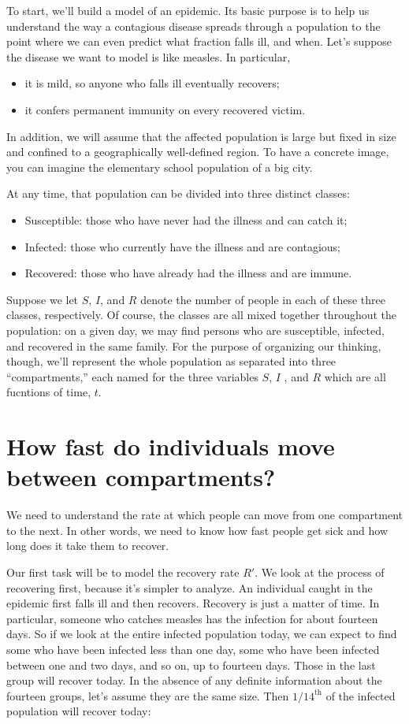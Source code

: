 \documentclass
[justified,nohyper]
{tufte-handout}
\begin{document}
To start, we'll build a model of an epidemic. Its basic purpose is to help us 
understand the way a contagious disease spreads through a population to the point 
where we can even predict what fraction falls ill, and when. Let's suppose the 
disease we want to model is like measles. In particular,
\begin{itemize}
	\item it is mild, so anyone who falls ill eventually recovers;
	\item it confers permanent immunity on every recovered victim.
\end{itemize}

In addition, we will assume that the affected population is large but fixed in 
size and confined to a geographically well-defined region. To have a concrete 
image, you can imagine the elementary school population of a big city.

At any time, that population can be divided into three distinct classes:
\begin{itemize}
	\item Susceptible: those who have never had the illness and can catch it;
	\item Infected: those who currently have the illness and are contagious;
	\item Recovered: those who have already had the illness and are immune.
\end{itemize}

Suppose we let $S$, $I$, and $R$ denote the number of people in each of these 
three classes, respectively. Of course, the classes are all mixed together 
throughout the population: on a given day, we may find persons who are 
susceptible, infected, and recovered in the same family. For the purpose of 
organizing our thinking, though, we'll represent the whole population as 
separated into three ``compartments,'' each named for the three variables $S$, $I$
, and $R$ which are all fucntions of time, $t$.

\section{How fast do individuals move between compartments?} 
We need to understand the rate at which people can move from one compartment to 
the next. In other words, we need to know how fast people get sick and how long 
does it take them to recover.

Our first task will be to model the recovery rate $R'$. We look at the process of 
recovering first, because it's simpler to analyze. An individual caught in the 
epidemic first falls ill and then recovers. Recovery is just a matter of time. In 
particular, someone who catches measles has the infection for about fourteen 
days. So if we look at the entire infected population today, we can expect to 
find some who have been infected less than one day, some who have been infected 
between one and two days, and so on, up to fourteen days. Those in the last group 
will recover today. In the absence of any definite information about the fourteen 
groups, let's assume they are the same size. Then $1/14^{\text{th}}$ of the 
infected population will recover today:
\end{document}
